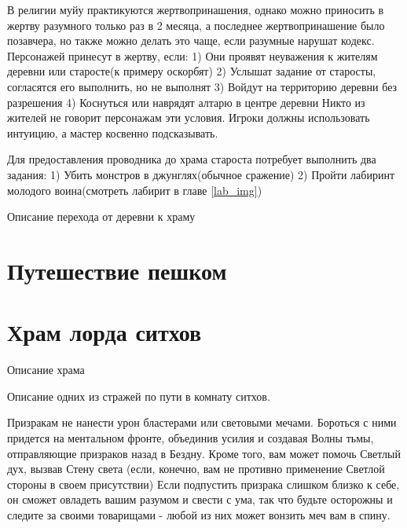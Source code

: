 \documentclass{article}
\begin{document}
В религии муйу практикуются жертвопринашения, однако можно приносить в жертву разумного только раз в 2 месяца, а последнее жертвопринашение было позавчера, но также можно делать это чаще, если разумные нарушат кодекс.
Персонажей принесут в жертву, если:
1) Они проявят неуважения к жителям деревни или старосте(к примеру оскорбят)
2) Услышат задание от старосты, согласятся его выполнить, но не выполнят
3) Войдут на территорию деревни без разрешения
4) Коснуться или наврядят алтарю в центре деревни
Никто из жителей не говорит персонажам эти условия. Игроки должны использовать интуицию, а мастер косвенно подсказывать.

Для предоставления проводника до храма староста потребует выполнить два задания:
1) Убить монстров в джунглях(обычное сражение)
2) Пройти лабиринт молодого воина(смотреть лабирит в главе \ref{lab_img})


Описание перехода от деревни к храму
\begin{myquote}
\color{sw}

\end{myquote}

\section{Путешествие пешком}


\section{Храм лорда ситхов}
Описание храма
\begin{myquote}
\color{sw}

\end{myquote}

Описание одних из стражей по пути в комнату ситхов.
\begin{myquote}
\color{sw}

\end{myquote}
Призракам не нанести урон бластерами или световыми мечами.
Бороться с ними придется на ментальном фронте, объединив усилия и создавая Волны тьмы, отправляющие призраков назад в Бездну.
Кроме того, вам может помочь Светлый дух, вызвав Стену света (если, конечно, вам не противно применение Светлой стороны в своем присутствии)
Если подпустить призрака слишком близко к себе, он сможет овладеть вашим разумом и свести с ума, так что будьте осторожны и следите за своими товарищами - любой из них может вонзить меч вам в спину.
\end{document}
